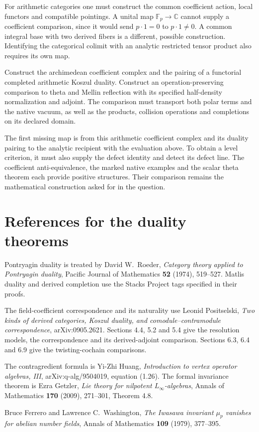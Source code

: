 For arithmetic categories one
must construct the common
coefficient action, local
functors and compatible
pointings. A unital map
$\mathbb F_p\to\mathbb C$
cannot supply a coefficient
comparison, since it would
send $p\cdot1=0$ to
$p\cdot1\ne0$.
A common integral base with
two derived fibers is a
different, possible construction.
Identifying the categorical
colimit with an analytic
restricted tensor product
also requires its own map.

\begin{question}
\label{v4-arith:md:qn:arithmetic}
Construct the archimedean
coefficient complex and the
pairing of a functorial completed
arithmetic Koszul duality.
Construct an operation-preserving
comparison to theta and Mellin
reflection with its specified
half-density normalization and
adjoint.
The comparison must transport
both polar terms and the native
vacuum, as well as the products,
collision operations and
completions on its declared
domain.
\end{question}

The first missing map is from
this arithmetic coefficient
complex and its duality pairing
to the analytic recipient with
the evaluation above.
To obtain a level criterion,
it must also supply the defect
identity and detect its defect
line.
The coefficient anti-equivalence,
the marked native examples and
the scalar theta theorem each
provide positive structures.
Their comparison remains the
mathematical construction asked
for in the question.

\section*{References for the duality theorems}

Pontryagin duality is treated by David W.~Roeder,
\emph{Category theory applied to Pontryagin duality},
Pacific Journal of Mathematics \textbf{52} (1974), 519--527.
Matlis duality and derived completion use the Stacks Project
tags specified in their proofs.

The field-coefficient correspondence and its naturality use
Leonid Positselski,
\emph{Two kinds of derived categories, Koszul duality,
and comodule--contramodule correspondence}, arXiv:0905.2621.
Sections 4.4, 5.2 and 5.4 give the resolution models,
the correspondence and its derived-adjoint comparison.
Sections 6.3, 6.4 and 6.9 give the twisting-cochain comparisons.

The contragredient formula is Yi-Zhi Huang,
\emph{Introduction to vertex operator algebras, III},
arXiv:q-alg/9504019, equation (1.26).
The formal invariance theorem is Ezra Getzler,
\emph{Lie theory for nilpotent \(L_\infty\)-algebras},
Annals of Mathematics \textbf{170} (2009), 271--301, Theorem 4.8.

Bruce Ferrero and Lawrence C.~Washington,
\emph{The Iwasawa invariant \(\mu_p\) vanishes for abelian number fields},
Annals of Mathematics \textbf{109} (1979), 377--395.

